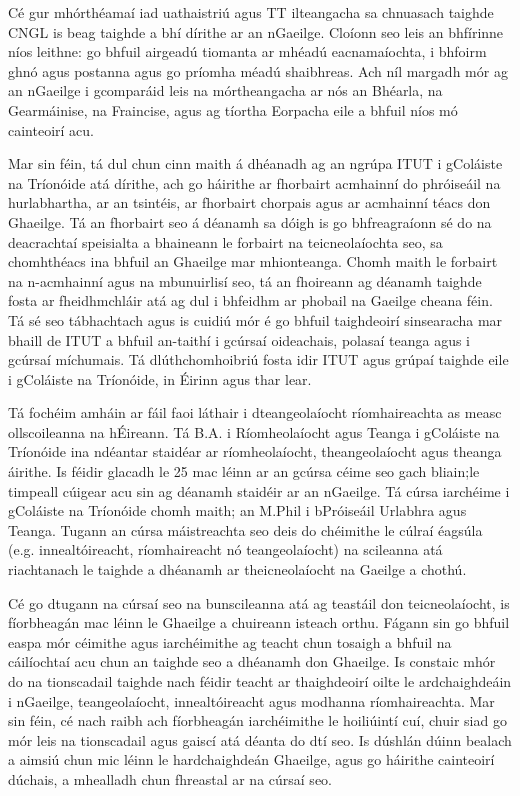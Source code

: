 \begin{multicols}{2}
Cé gur mhórthéamaí iad uathaistriú agus TT ilteangacha sa chnuasach taighde CNGL is beag taighde a bhí dírithe ar an nGaeilge. Cloíonn seo leis an bhfírinne níos leithne: go bhfuil airgeadú tiomanta ar mhéadú eacnamaíochta, i bhfoirm ghnó agus postanna agus go príomha méadú shaibhreas. Ach níl margadh mór ag an nGaeilge i gcomparáid leis na mórtheangacha ar nós an Bhéarla, na Gearmáinise, na Fraincise, agus ag tíortha Eorpacha eile a bhfuil níos mó cainteoirí acu. 

Mar sin féin, tá dul chun cinn maith á dhéanadh ag an ngrúpa ITUT i gColáiste na Tríonóide atá dírithe, ach go háirithe ar fhorbairt acmhainní do phróiseáil na hurlabhartha, ar an tsintéis, ar fhorbairt chorpais agus ar acmhainní téacs don Ghaeilge. Tá an fhorbairt seo á déanamh sa dóigh is go bhfreagraíonn sé do na deacrachtaí speisialta a bhaineann le forbairt na teicneolaíochta seo, sa chomhthéacs ina bhfuil an Ghaeilge mar mhionteanga. Chomh maith le forbairt na n-acmhainní agus na mbunuirlisí seo, tá an fhoireann ag déanamh taighde fosta ar fheidhmchláir atá ag dul i bhfeidhm ar phobail na Gaeilge cheana féin. Tá sé seo tábhachtach agus is cuidiú mór é go bhfuil taighdeoirí sinsearacha mar bhaill de ITUT a bhfuil an-taithí i gcúrsaí oideachais, polasaí teanga agus i gcúrsaí míchumais. Tá dlúthchomhoibriú fosta idir ITUT agus grúpaí taighde eile i gColáiste na Tríonóide, in Éirinn agus thar lear.

Tá fochéim amháin ar fáil faoi láthair i dteangeolaíocht ríomhaireachta as measc ollscoileanna na hÉireann. Tá B.A. i Ríomheolaíocht  agus  Teanga i  gColáiste na Tríonóide ina ndéantar staidéar ar ríomheolaíocht, theangeolaíocht agus theanga áirithe. Is féidir glacadh le 25 mac léinn ar an gcúrsa céime seo gach bliain;le timpeall cúigear acu sin ag déanamh staidéir ar an nGaeilge. Tá cúrsa iarchéime i gColáiste na Tríonóide chomh maith; an M.Phil i bPróiseáil Urlabhra agus Teanga. Tugann an cúrsa máistreachta seo deis do chéimithe le cúlraí éagsúla (e.g. innealtóireacht, ríomhaireacht nó teangeolaíocht) na scileanna atá riachtanach le taighde a dhéanamh ar theicneolaíocht na Gaeilge a chothú.

Cé go dtugann na cúrsaí seo na bunscileanna atá ag teastáil don teicneolaíocht, is fíorbheagán mac léinn le Ghaeilge a chuireann isteach orthu. Fágann sin go bhfuil easpa mór céimithe agus iarchéimithe  ag teacht chun tosaigh a bhfuil na cáilíochtaí acu chun an taighde seo a dhéanamh don Ghaeilge. Is constaic mhór do na tionscadail taighde nach féidir teacht ar thaighdeoirí oilte le ardchaighdeáin i nGaeilge, teangeolaíocht, innealtóireacht agus modhanna ríomhaireachta. Mar sin féin, cé nach raibh ach fíorbheagán iarchéimithe le hoiliúintí cuí, chuir siad go mór leis na tionscadail agus gaiscí atá déanta do dtí seo. Is dúshlán dúinn bealach a aimsiú chun mic léinn le hardchaighdeán Ghaeilge, agus go háirithe cainteoirí dúchais, a mhealladh chun fhreastal ar na cúrsaí seo.


\end{multicols}

